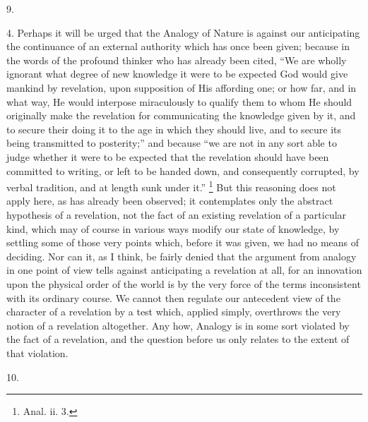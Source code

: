 9.

4. Perhaps it will be urged that the Analogy of Nature
is against our anticipating the continuance of an
external authority which has once been given; because in
the words of the profound thinker who has already been
cited, ``We are wholly ignorant what degree of new
knowledge it were to be expected God would give mankind
by revelation, upon supposition of His affording one; or
how far, and in what way, He would interpose miraculously
to qualify them to whom He should originally make the
revelation for communicating the knowledge given by it,
and to secure their doing it to the age in which they
should live, and to secure its being transmitted to
posterity;'' and because ``we are not in any sort
able to judge whether it were to be expected that the
revelation should have been committed to writing, or left
to be handed down, and consequently corrupted, by verbal
tradition, and at length sunk under it.'' \footnote{Anal. ii. 3.} But
this reasoning does not apply here, as has already been
observed; it contemplates only the abstract hypothesis of
a revelation, not the fact of an existing revelation of a
particular kind, which may of course in various ways
modify our state of knowledge, by settling some of those
very points which, before it was given, we had no means
of deciding. Nor can it, as I think, be fairly denied
that the argument from analogy in one point of view tells
against anticipating a revelation at all, for an
innovation upon the physical order of the world is by the
very force of the terms inconsistent with its ordinary
course. We cannot then regulate our antecedent view of
the character of a revelation by a test which, applied
simply, overthrows the very notion of a revelation
altogether. Any how, Analogy is in some sort violated by
the fact of a revelation, and the question before us only
relates to the extent of that violation.

10.

